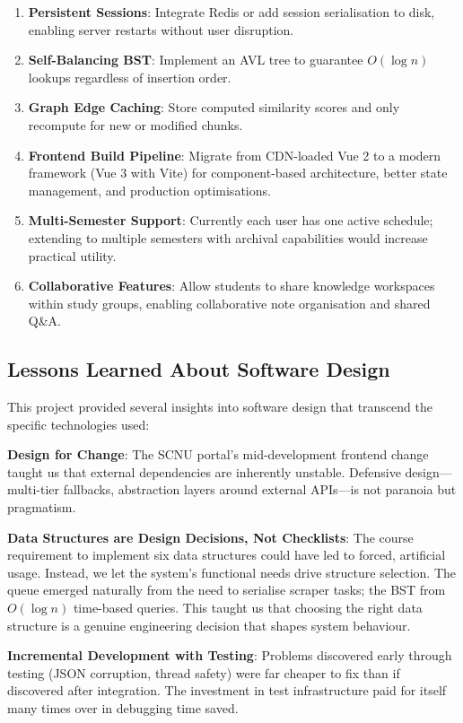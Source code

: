 \documentclass[11pt,a4paper]{article}
\begin{document}
\begin{enumerate}
    \item \textbf{Persistent Sessions}: Integrate Redis or add session serialisation to disk, enabling server restarts without user disruption.
    \item \textbf{Self-Balancing BST}: Implement an AVL tree to guarantee $O(\log n)$ lookups regardless of insertion order.
    \item \textbf{Graph Edge Caching}: Store computed similarity scores and only recompute for new or modified chunks.
    \item \textbf{Frontend Build Pipeline}: Migrate from CDN-loaded Vue 2 to a modern framework (Vue 3 with Vite) for component-based architecture, better state management, and production optimisations.
    \item \textbf{Multi-Semester Support}: Currently each user has one active schedule; extending to multiple semesters with archival capabilities would increase practical utility.
    \item \textbf{Collaborative Features}: Allow students to share knowledge workspaces within study groups, enabling collaborative note organisation and shared Q\&A.
\end{enumerate}

\subsection{Lessons Learned About Software Design}
This project provided several insights into software design that transcend the specific technologies used:

\textbf{Design for Change}: The SCNU portal's mid-development frontend change taught us that external dependencies are inherently unstable. Defensive design---multi-tier fallbacks, abstraction layers around external APIs---is not paranoia but pragmatism.

\textbf{Data Structures are Design Decisions, Not Checklists}: The course requirement to implement six data structures could have led to forced, artificial usage. Instead, we let the system's functional needs drive structure selection. The queue emerged naturally from the need to serialise scraper tasks; the BST from $O(\log n)$ time-based queries. This taught us that choosing the right data structure is a genuine engineering decision that shapes system behaviour.

\textbf{Incremental Development with Testing}: Problems discovered early through testing (JSON corruption, thread safety) were far cheaper to fix than if discovered after integration. The investment in test infrastructure paid for itself many times over in debugging time saved.
\end{document}
